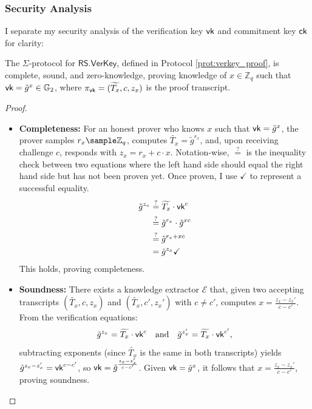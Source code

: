 \subsubsection{Security Analysis}
I separate my security analysis of the verification key $\mathsf{vk}$ and commitment key $\mathsf{ck}$ for clarity:

\begin{theorem}
    The $\Sigma$-protocol for $\mathsf{RS.VerKey}$, defined in Protocol \ref{prot:verkey_proof}, is complete, sound, and zero-knowledge, proving knowledge of $x \in \mathbb{Z}_q$ such that $\mathsf{vk} = \tilde{g}^x \in \mathbb{G}_2$, where $\pi_{\mathsf{vk}} = (\widetilde{T_{x}}, c, z_x)$ is the proof transcript.
\end{theorem}

\begin{proof}
    \begin{itemize}
        \item \textbf{Completeness:} For an honest prover who knows $x$ such that $\mathsf{vk} = \tilde{g}^x$, the prover samples $r_x \sample \mathbb{Z}_q$, computes $\widetilde{T_{x}} = \tilde{g}^{r_x}$, and, upon receiving challenge $c$, responds with $z_x = r_x + c \cdot x$. Notation-wise, $\stackrel{?}{=}$ is the inequality check between two equations where the left hand side should equal the right hand side but has not been proven yet. Once proven, I use $\checkmark$ to represent a successful equality.
    \begin{align*}
        \tilde{g}^{z_x} &\stackrel{?}{=} \widetilde{T_{x}} \cdot \mathsf{vk}^c \\
        &\stackrel{?}{=} \tilde{g}^{r_x} \cdot \tilde{g}^{xc} \\
        &\stackrel{?}{=} \tilde{g}^{r_x + xc}\\
        &=\tilde{g}^{z_x} \checkmark
    \end{align*} 
    This holds, proving completeness.

        \item \textbf{Soundness:} There exists a knowledge extractor $\mathcal{E}$ that, given two accepting transcripts $(\widetilde{T_{x}}, c, z_x)$ and $(\widetilde{T_{x}}, c', z_x')$ with $c \neq c'$, computes $x = \frac{z_x - z_x'}{c - c'}$. From the verification equations:
        \[
        \tilde{g}^{z_x} = \widetilde{T_{x}} \cdot \mathsf{vk}^c \quad \text{and} \quad \tilde{g}^{z_x'} = \widetilde{T_{x}} \cdot \mathsf{vk}^{c'},
        \]
        subtracting exponents (since $\widetilde{T_{x}}$ is the same in both transcripts) yields $\tilde{g}^{z_x - z_x'} = \mathsf{vk}^{c - c'}$, so $\mathsf{vk} = \tilde{g}^{\frac{z_x - z_x'}{c - c'}}$. Given $\mathsf{vk} = \tilde{g}^x$, it follows that $x = \frac{z_x - z_x'}{c - c'}$, proving soundness.


\end{itemize}
\end{proof}
